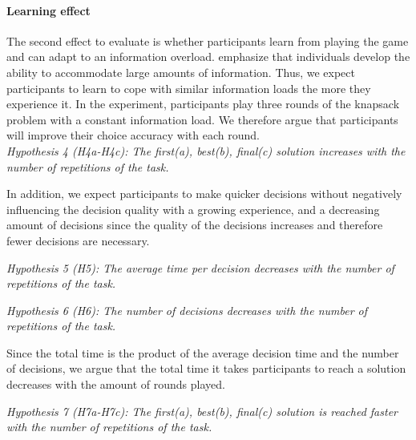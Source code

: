 \paragraph{Learning effect}
The second effect to evaluate is whether participants learn from playing the game and can adapt to an information overload. \cite{Jacoby1974} emphasize that individuals develop the ability to accommodate large amounts of information. Thus, we expect participants to learn to cope with similar information loads the more they experience it. In the experiment, participants play three rounds of the knapsack problem with a constant information load. We therefore argue that participants will improve their choice accuracy with each round.\\
\textit{Hypothesis 4 (H4a-H4c): The first(a), best(b), final(c) solution increases with the number of repetitions of the task. }

In addition, we expect participants to make quicker decisions without negatively influencing the decision quality with a growing experience, and a decreasing amount of decisions since the quality of the decisions increases and therefore fewer decisions are necessary.

\textit{Hypothesis 5 (H5): The average time per decision decreases with the number of repetitions of the task. }

\textit{Hypothesis 6 (H6): The number of decisions decreases with the number of repetitions of the task. }

Since the total time is the product of the average decision time and the number of decisions, we argue that the total time it takes participants to reach a solution decreases with the amount of rounds played.

\textit{Hypothesis 7 (H7a-H7c): The first(a), best(b), final(c) solution is reached faster with the number of repetitions of the task. }

